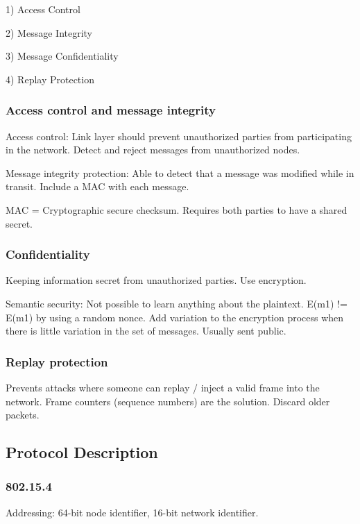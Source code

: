 \documentclass[10pt]{article}
\begin{document}
1) Access Control

2) Message Integrity

3) Message Confidentiality

4) Replay Protection


\subsubsection{Access control and message integrity}

Access control: Link layer should prevent unauthorized parties from participating in the network. Detect and reject messages from unauthorized nodes.

Message integrity protection: Able to detect that a message was modified while in transit. Include a MAC with each message.

MAC = Cryptographic secure checksum. Requires both parties to have a shared secret.


\subsubsection{Confidentiality}

Keeping information secret from unauthorized parties. Use encryption.

Semantic security: Not possible to learn anything about the plaintext. E(m1) != E(m1) by using a random nonce. Add variation to the encryption process when there is little variation in the set of messages. Usually sent public.


\subsubsection{Replay protection}

Prevents attacks where someone can replay / inject a valid frame into the network. Frame counters (sequence numbers) are the solution. Discard older packets.


\subsection{Protocol Description}

\subsubsection{802.15.4}

Addressing: 64-bit node identifier, 16-bit network identifier.
\end{document}
